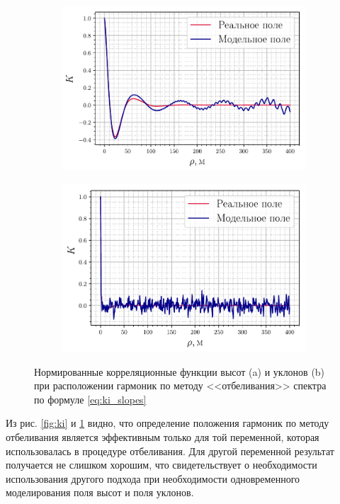 \begin{figure}[h!]
    \centering
    \begin{subfigure}{0.49\linewidth}
        \centering
        \includegraphics[width=\linewidth]{fig/correlation_height_slopes2.pdf}
        \caption{}
    \end{subfigure}
    \begin{subfigure}{0.49\linewidth}
        \centering
        \includegraphics[width=\linewidth]{fig/correlation_angles_slopes2.pdf}
        \caption{}
    \end{subfigure}
    \caption{Нормированные корреляционные функции высот (a) и уклонов (b) при расположении гармоник
    по методу <<отбеливания>> спектра по формуле \eqref{eq:ki_slopes} }
    \label{fig:ki_slopes}
\end{figure}

Из рис. \ref{fig:ki} и \ref{fig:ki_slopes} видно, что определение положения
гармоник по методу отбеливания является эффективным только для той переменной,
которая использовалась в процедуре отбеливания. Для другой переменной результат
получается не слишком хорошим, что свидетельствует о необходимости
использования другого подхода при необходимости одновременного моделирования
поля высот и поля уклонов.

